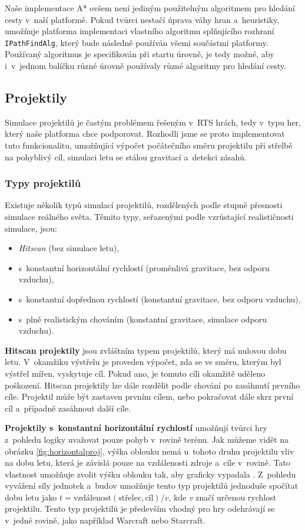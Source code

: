 Naše implementace A* ovšem není jediným použitelným algoritmem pro hledání cesty v~naší platformě. Pokud tvůrci nestačí úprava váhy hran a~heuristiky, umožňuje platforma implementaci vlastního algoritmu splňujícího rozhraní \texttt{IPathFindAlg}, který bude následně používán všemi součástmi platformy. Používaný algoritmus je specifikován při startu úrovně, je tedy možné, aby i~v~jednom balíčku různé úrovně používaly různé algoritmy pro hledání cesty.

\subsection{Projektily}
Simulace projektilů je častým problémem řešeným v~RTS hrách, tedy v~typu her, který naše platforma chce podporovat. Rozhodli jsme se proto implementovat tuto funkcionalitu, umožňující výpočet počátečního směru projektilu při střelbě na pohyblivý cíl, simulaci letu se stálou gravitací a~detekci zásahů. 

\subsubsection{Typy projektilů}
Existuje několik typů simulací projektilů, rozdělených podle stupně přesnosti simulace reálného světa. Těmito typy, seřazenými podle vzrůstající realističnosti simulace, jsou:
\begin{itemize}
	\item \textit{Hitscan} (bez simulace letu),
	\item s~konstantní horizontální rychlostí (proměnlivá gravitace, bez odporu vzduchu),
	\item s~konstantní dopřednou rychlostí (konstantní gravitace, bez odporu vzduchu),
	\item s~plně realistickým chováním (konstantní gravitace, simulace odporu vzduchu).
\end{itemize}

\textbf{Hitscan projektily} jsou zvláštním typem projektilů, který má nulovou dobu letu. V~okamžiku výstřelu je proveden výpočet, zda se ve směru, kterým byl výstřel mířen, vyskytuje cíl. Pokud ano, je tomuto cíli okamžitě uděleno poškození. Hitscan projektily lze dále rozdělit podle chování po zasáhnutí prvního cíle. Projektil může být zastaven prvním cílem, nebo pokračovat dále skrz první cíl a~případně zasáhnout další cíle.

\textbf{Projektily s~konstantní horizontální rychlostí} umožňují tvůrci hry z~pohledu logiky uvažovat pouze pohyb v~rovině terénu. Jak můžeme vidět na obrázku \ref{fig:horizontalproj}, výška oblouku nemá u~tohoto druhu projektilu vliv na dobu letu, která je závislá pouze na vzdálenosti zdroje a~cíle v~rovině. Tato vlastnost umožňuje zvolit výšku oblouku tak, aby graficky vypadala . Z~pohledu vyvážení síly jednotek a~budov umožňuje tento typ projektilů jednoduše spočítat dobu letu jako \( t=\text{vzdálenost}(\text{střelec}, \text{cíl}) / v \), kde \textit{v} značí určenou rychlost projektilu. Tento typ projektilů je především vhodný pro hry odehrávají se v~jedné rovině, jako například Warcraft nebo Starcraft.

